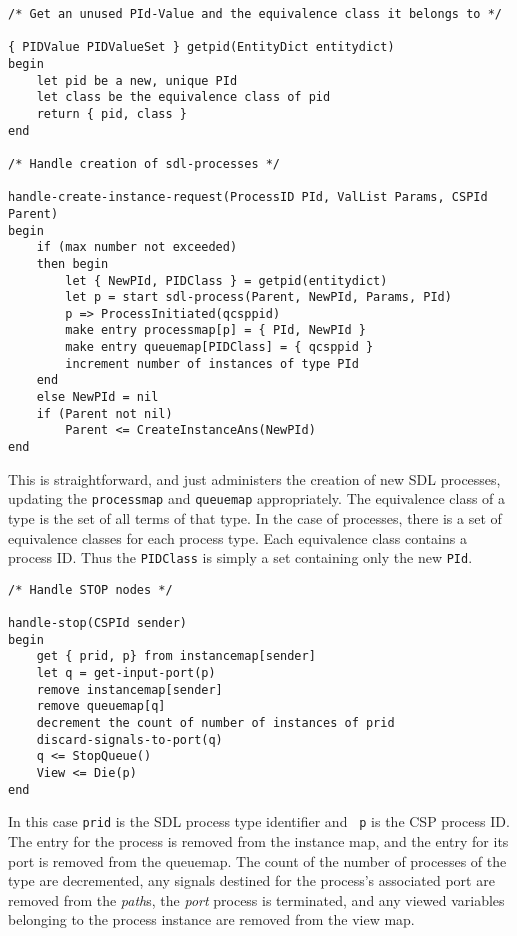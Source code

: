 \begin{verbatim}
/* Get an unused PId-Value and the equivalence class it belongs to */

{ PIDValue PIDValueSet } getpid(EntityDict entitydict)
begin
    let pid be a new, unique PId
    let class be the equivalence class of pid
    return { pid, class }
end

/* Handle creation of sdl-processes */

handle-create-instance-request(ProcessID PId, ValList Params, CSPId Parent)
begin
    if (max number not exceeded)
    then begin
        let { NewPId, PIDClass } = getpid(entitydict)
        let p = start sdl-process(Parent, NewPId, Params, PId)
        p => ProcessInitiated(qcsppid)
        make entry processmap[p] = { PId, NewPId }
        make entry queuemap[PIDClass] = { qcsppid }
        increment number of instances of type PId
    end
    else NewPId = nil
    if (Parent not nil)
        Parent <= CreateInstanceAns(NewPId)
end
\end{verbatim}

This is straightforward, and just administers the creation of new SDL
processes, updating the {\tt processmap} and {\tt queuemap}
appropriately. The equivalence class of a type is the set of all terms
of that type. In the case of processes, there is a set of equivalence
classes for each process type. Each equivalence class contains a 
process ID. Thus the {\tt PIDClass} is simply a set containing 
only the new {\tt PId}.

\begin{verbatim}
/* Handle STOP nodes */

handle-stop(CSPId sender)
begin
    get { prid, p} from instancemap[sender]
    let q = get-input-port(p)
    remove instancemap[sender]
    remove queuemap[q]
    decrement the count of number of instances of prid
    discard-signals-to-port(q)
    q <= StopQueue()
    View <= Die(p)
end
\end{verbatim}

In this case {\tt prid} is the SDL process type identifier and {\tt
p} is the CSP process ID. 
The entry for the process is removed from
the instance map, and the entry for its port is removed from the
queuemap.
The count of the number of processes of the type are
decremented, any signals destined for the process's associated port
are removed from the {\em path}s, the {\em port} process is
terminated, and any viewed variables belonging to the process
instance are removed from the view map.

